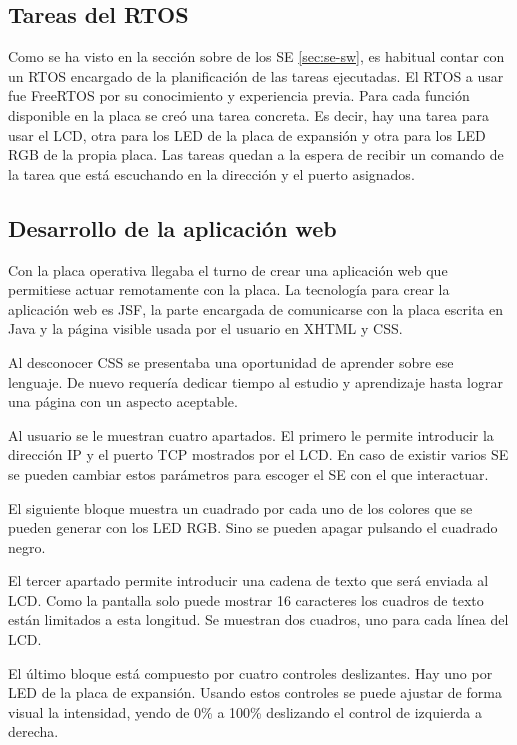 \subsection{Tareas del RTOS}{\label{sec:desarrollo-rtos}}
Como se ha visto en la sección sobre  de los SE 
\ref{sec:se-sw}, es habitual contar con un RTOS encargado de la planificación
de las tareas ejecutadas. El RTOS a usar fue FreeRTOS por su conocimiento y
experiencia previa. Para cada función disponible en la placa se creó una tarea
concreta. Es decir, hay una tarea para usar el LCD, otra para los LED de la
placa de expansión y otra  para los LED RGB de la propia placa. Las tareas
quedan a la espera de recibir un comando de la tarea que está escuchando en la
dirección y el puerto asignados.

\subsection{Desarrollo de la aplicación web}{\label{sec:desarrollo-app}}
Con la placa operativa llegaba el turno de crear una aplicación web que
permitiese actuar remotamente con la placa. La tecnología para crear la
aplicación web es JSF, la parte encargada de comunicarse con la placa escrita
en Java y la página visible usada por el usuario en XHTML y CSS.

Al desconocer CSS se presentaba una oportunidad de aprender sobre ese lenguaje.
De nuevo requería dedicar tiempo al estudio y aprendizaje hasta lograr una
página con un aspecto aceptable.

Al usuario se le muestran cuatro apartados. El primero le permite introducir la
dirección IP y el puerto TCP mostrados por el LCD. En caso de existir varios SE
se pueden cambiar estos parámetros para escoger el SE con el que interactuar.

El siguiente bloque muestra un cuadrado por cada uno de los colores que se
pueden generar con los LED RGB. Sino se pueden apagar pulsando el cuadrado
negro.

El tercer apartado permite introducir una cadena de texto que será enviada al
LCD. Como la pantalla solo puede mostrar 16 caracteres los cuadros de texto
están limitados a esta longitud. Se muestran dos cuadros, uno para cada línea
del LCD.

El último bloque está compuesto por cuatro controles deslizantes. Hay uno por
LED de la placa de expansión. Usando estos controles se puede ajustar de forma
visual la intensidad, yendo de 0\% a 100\% deslizando el control de izquierda
a derecha.


